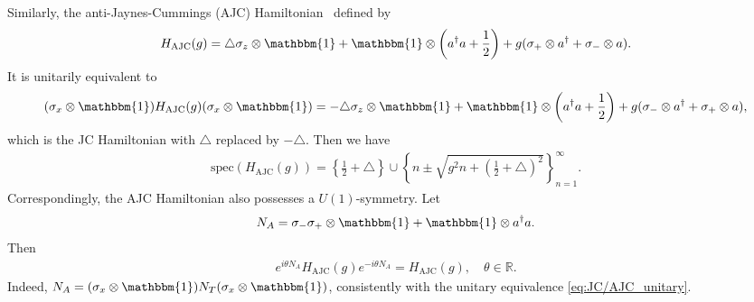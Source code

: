 \documentclass[12pt,dvipdfmx]{article}
\newcommand{\RR}{\mathbb{R}}
\newcommand{\one}{\mathbbm{1}}
\begin{document}
Similarly, the anti-Jaynes-Cummings (AJC) Hamiltonian~\cite{SK93, KMMR24, BCNNG24} defined by
\begin{align*}
    H_{\mathrm{AJC}}(g) 
    = 
    \triangle\sigma_z \otimes \one 
    + 
    \one \otimes \left( a^\dagger a + \frac12 \right) 
    + 
    g (\sigma_+ \otimes a^\dagger + \sigma_- \otimes a).
\end{align*}
It is unitarily equivalent to %
\begin{align}\label{eq:JC/AJC_unitary}
    (\sigma_x \otimes \one) H_{\mathrm{AJC}}(g) (\sigma_x \otimes \one) 
    = 
    -\triangle\sigma_z \otimes \one 
    + 
    \one \otimes \left( a^\dagger a + \frac12 \right) 
    + 
    g(\sigma_- \otimes a^\dagger + \sigma_+ \otimes a),
\end{align}
which is the JC Hamiltonian with $\triangle$ replaced by $-\triangle$. Then we have
\begin{align*}
    \mathrm{spec}(H_{\mathrm{AJC}}(g)) 
    = 
    \left\{ \frac12 + \triangle \right\} 
    \cup 
    \left\{ 
        n \pm \sqrt{ g^2 n + \left( \frac12 + \triangle \right)^2 }
    \right\}_{n=1}^{\infty}. 
\end{align*}
Correspondingly, the AJC Hamiltonian also possesses a $U(1)$-symmetry. Let
\begin{align*}
    N_A
    =
    \sigma_-\sigma_+ \otimes \one
    +
    \one \otimes a^\dagger a.
\end{align*}
Then
\begin{align}\label{eq:AJC_U1_symm}
    e^{i\theta N_A} H_{\mathrm{AJC}}(g) e^{-i\theta N_A}
    =
    H_{\mathrm{AJC}}(g),
    \quad
    \theta\in\RR.
\end{align}
Indeed, $N_A=(\sigma_x\otimes\one)N_T(\sigma_x\otimes\one)$, consistently with the unitary equivalence \eqref{eq:JC/AJC_unitary}.

%
%
\end{document}
